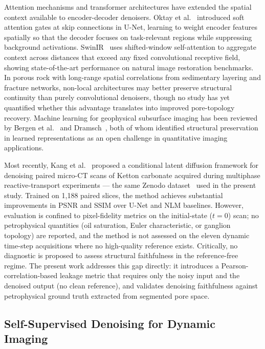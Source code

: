 \documentclass[review,12pt]{elsarticle}
\begin{document}
Attention mechanisms and transformer architectures have extended the
spatial context available to encoder-decoder denoisers.  Oktay et al.\
\cite{Oktay2018attention} introduced soft attention gates at skip
connections in U-Net, learning to weight encoder features spatially so
that the decoder focuses on task-relevant regions while suppressing
background activations.  SwinIR~\cite{Liang2021swinir} uses
shifted-window self-attention to aggregate context across distances that
exceed any fixed convolutional receptive field, showing state-of-the-art
performance on natural image restoration benchmarks.  In porous rock with
long-range spatial correlations from sedimentary layering and fracture
networks, non-local architectures may better preserve structural
continuity than purely convolutional denoisers, though no study has yet
quantified whether this advantage translates into improved pore-topology
recovery.  Machine learning for geophysical subsurface imaging has been
reviewed by Bergen et al.~\cite{Bergen2019} and Dramsch~\cite{Dramsch2020},
both of whom identified structural preservation in learned representations
as an open challenge in quantitative imaging applications.

Most recently, Kang et al.~\cite{Kang2026} proposed a conditional latent
diffusion framework for denoising paired micro-CT scans of Ketton
carbonate acquired during multiphase reactive-transport experiments ---
the same Zenodo dataset~\cite{Ma2026zenodo} used in the present study.
Trained on 1,188 paired slices, the method achieves substantial
improvements in PSNR and SSIM over U-Net and NLM baselines.  However,
evaluation is confined to pixel-fidelity metrics on the
initial-state ($t\!=\!0$) scan; no petrophysical quantities (oil
saturation, Euler characteristic, or ganglion topology) are reported,
and the method is not assessed on the eleven dynamic time-step
acquisitions where no high-quality reference exists.  Critically,
no diagnostic is proposed to assess structural faithfulness in the
reference-free regime.  The present work addresses this gap directly:
it introduces a Pearson-correlation-based leakage metric that requires
only the noisy input and the denoised output (no clean reference), and
validates denoising faithfulness against petrophysical ground truth
extracted from segmented pore space.

\subsection{Self-Supervised Denoising for Dynamic Imaging}
\label{sec:related:self_supervised}
\end{document}
